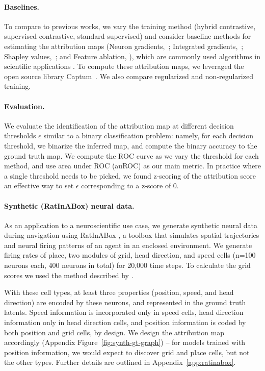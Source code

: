 \paragraph{Baselines.}
    To compare to previous works, we vary the training method (hybrid contrastive, supervised contrastive, standard supervised) and consider baseline methods for estimating the attribution maps (Neuron gradients,~\citealp{Simonyan2013DeepIC}; Integrated gradients,~\citealp{shrikumar2018computationally,Sundararajan2017AxiomaticAF}; Shapley values,~\citealp{shapley1953value,lundberg2017unified}; and Feature ablation, \citealp{molnar2022}), which are commonly used algorithms in scientific applications \citep{samek2019explainable,molnar2022}. To compute these attribution maps, we leveraged the open source library Captum~\citep{kokhlikyan2020captum}. We also compare regularized and non-regularized training. 

\paragraph{Evaluation.}
    We evaluate the identification of the attribution map at different decision thresholds $\epsilon$ similar to a binary classification problem: namely, for each decision threshold, we binarize the inferred map, and compute the binary accuracy to the ground truth map. We compute the ROC curve as we vary the threshold for each method, and use area under ROC (auROC) as our main metric. In practice where a single threshold needs to be picked, we found z-scoring of the attribution score an effective way to set $\epsilon$ corresponding to a z-score of 0.

\paragraph{Synthetic (RatInABox) neural data.}
    
    As an application to a neuroscientific use case, we generate synthetic neural data during navigation using RatInABox \citep{george2022ratinabox}, a toolbox that simulates spatial trajectories and neural firing patterns of an agent in an enclosed environment.
    We generate firing rates of place, two modules of grid, head direction, and speed cells (n=100 neurons each, 400 neurons in total) for 20,000 time steps.
    To calculate the grid scores we used the method described by \citet{sargolini2006conjunctive}.
    
    With these cell types, at least three properties (position, speed, and head direction) are encoded by these neurons, and represented in the ground truth latents. Speed information is incorporated only in speed cells, head direction information only in head direction cells, and position information is coded by both position and grid cells, by design. We design the attribution map accordingly (Appendix Figure~\ref{fig:synth-gt-graph}) -- for models trained with position information, we would expect to discover grid and place cells, but not the other types.
    Further details are outlined in Appendix~\ref{app:ratinabox}.




